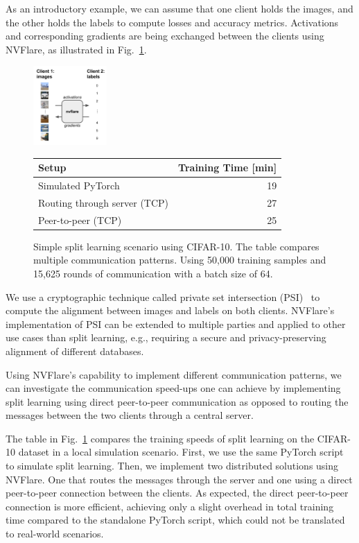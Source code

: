 \documentclass[11pt]{article}
\begin{document}
As an introductory example, we can assume that one client holds the images, and the other holds the labels to compute losses and accuracy metrics. Activations and corresponding gradients are being exchanged between the clients using NVFlare, as illustrated in Fig.~\ref{fig:split_learning}. 
%
\begin{figure}[htbp]
\centering
\includegraphics[width=0.25\textwidth]{fig/split_learning.pdf}
\hspace{2em}
\footnotesize
\begin{tabular}[b]{||l r||} 
\hline
\textbf{Setup} & \textbf{Training Time [min]} \\ [0.5ex] 
\hline\hline
Simulated PyTorch & 19 \\
Routing through server (TCP) & 27  \\
Peer-to-peer (TCP) & 25  \\ [1ex] 
\hline
\end{tabular}
\caption{Simple split learning scenario using CIFAR-10. The table compares multiple communication patterns. Using 50,000 training samples and 15,625 rounds of communication with a batch size of 64. \label{fig:split_learning}} 
\end{figure}
%
We use a cryptographic technique called private set intersection (PSI)~\cite{enwiki:1131516757} to compute the alignment between images and labels on both clients. NVFlare's implementation of PSI can be extended to multiple parties and applied to other use cases than split learning, e.g., requiring a secure and privacy-preserving alignment of different databases.

Using NVFlare's capability to implement different communication patterns, we can investigate the communication speed-ups one can achieve by implementing split learning using direct peer-to-peer communication as opposed to routing the messages between the two clients through a central server. 

The table in Fig.~\ref{fig:split_learning} compares the training speeds of split learning on the CIFAR-10 dataset in a local simulation scenario. First, we use the same PyTorch script to simulate split learning. Then, we implement two distributed solutions using NVFlare. One that routes the messages through the server and one using a direct peer-to-peer connection between the clients. As expected, the direct peer-to-peer connection is more efficient, achieving only a slight overhead in total training time compared to the standalone PyTorch script, which could not be translated to real-world scenarios.
\end{document}
